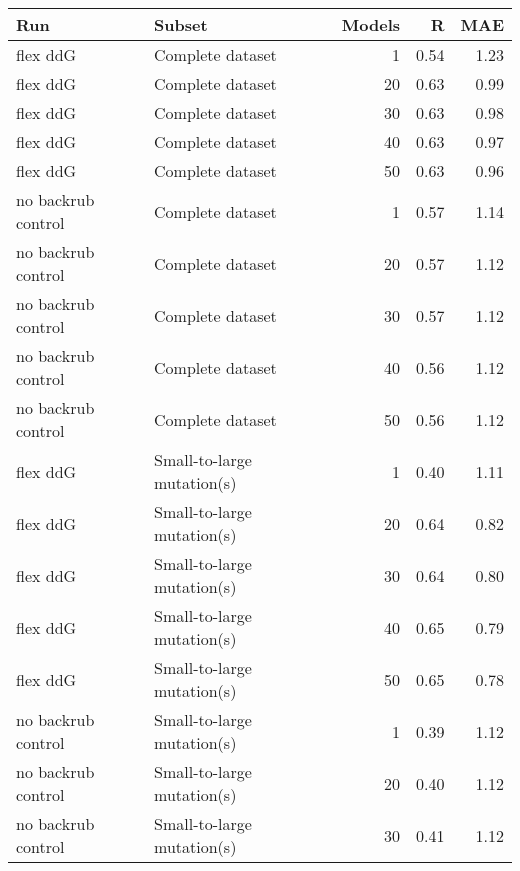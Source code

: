 \begin{table}
\begin{tabular}{llrrr}
\toprule
                Run &                               Subset &  Models &    R &  MAE \\
\midrule
           flex ddG &                     Complete dataset &           1 & 0.54 & 1.23 \\
           flex ddG &                     Complete dataset &          20 & 0.63 & 0.99 \\
           flex ddG &                     Complete dataset &          30 & 0.63 & 0.98 \\
           flex ddG &                     Complete dataset &          40 & 0.63 & 0.97 \\
           flex ddG &                     Complete dataset &          50 & 0.63 & 0.96 \\
 no backrub control &                     Complete dataset &           1 & 0.57 & 1.14 \\
 no backrub control &                     Complete dataset &          20 & 0.57 & 1.12 \\
 no backrub control &                     Complete dataset &          30 & 0.57 & 1.12 \\
 no backrub control &                     Complete dataset &          40 & 0.56 & 1.12 \\
 no backrub control &                     Complete dataset &          50 & 0.56 & 1.12 \\
           flex ddG &           Small-to-large mutation(s) &           1 & 0.40 & 1.11 \\
           flex ddG &           Small-to-large mutation(s) &          20 & 0.64 & 0.82 \\
           flex ddG &           Small-to-large mutation(s) &          30 & 0.64 & 0.80 \\
           flex ddG &           Small-to-large mutation(s) &          40 & 0.65 & 0.79 \\
           flex ddG &           Small-to-large mutation(s) &          50 & 0.65 & 0.78 \\
 no backrub control &           Small-to-large mutation(s) &           1 & 0.39 & 1.12 \\
 no backrub control &           Small-to-large mutation(s) &          20 & 0.40 & 1.12 \\
 no backrub control &           Small-to-large mutation(s) &          30 & 0.41 & 1.12 \\

\end{tabular}
\end{table}
